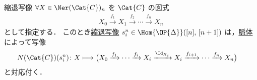 \documentclass[TQFT_main]{subfiles}
\begin{document}
\begin{myexample}[label=ex:nerve-degen]{縮退写像}
    $\forall X \in \Ner (\Cat{C})_n$ を $\Cat{C}$ の図式
    \begin{align}
        X_0 \xrightarrow{f_1} X_1 \xrightarrow{f_2} \cdots \xrightarrow{f_n} X_n
    \end{align}
    として指定する．
    このとき\hyperref[def:simplex-cat]{縮退写像} $s^n_i \in \Hom{\OP{\Delta}}([n],\, [n+1])$ は，\hyperref[def:nerve]{脈体}によって写像
    \begin{align}
        N(\Cat{C})(s^n_i)\colon 
        X &\lmto \bigl( X_0 \xrightarrow{f_1} \cdots \xrightarrow{f_{i}} X_{i} \xrightarrow{\Id_{X_i}} X_{i} \xrightarrow{f_{i+1}} \cdots \xrightarrow{f_n} X_{n} \bigr) 
    \end{align}
    と対応付く．
\end{myexample}
\end{document}
